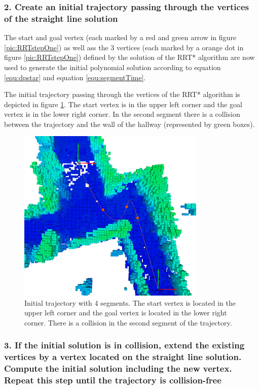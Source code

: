 \subsubsection{2. Create an initial trajectory passing through the vertices of the straight line solution}

The start and goal vertex (each marked by a red and green arrow in figure \ref{pic:RRTstepOne}) as well ass the 3 vertices (each marked by a orange dot in figure \ref{pic:RRTstepOne}) defined by the solution of the RRT* algorithm are now used to generate the initial polynomial solution according to equation \ref{equ:dpstar} and equation \ref{equ:segmentTime}. \newline

The initial trajectory passing through the vertices of the RRT* algorithm is depicted in figure \ref{pic:RRTstepTwo}. The start vertex is in the upper left corner and the goal vertex is in the lower right corner. In the second segment there is a collision between the trajectory and the wall of the hallway (represented by green boxes). 

\begin{figure}[h]
   \centering
   \includegraphics[trim = 45mm 0mm 35mm 0mm,clip,width=0.8\textwidth]{pics/extensionALongP.png}
   \caption{Initial trajectory with 4 segments. The start vertex is located in the upper left corner and the goal vertex is located in the lower right corner. There is a collision in the second segment of the trajectory.}
\label{pic:RRTstepTwo}
\end{figure}

\subsubsection{3. If the initial solution is in collision, extend the existing vertices by a vertex located on the straight line solution. Compute the initial solution including the new vertex. Repeat this step until the trajectory is collision-free}

